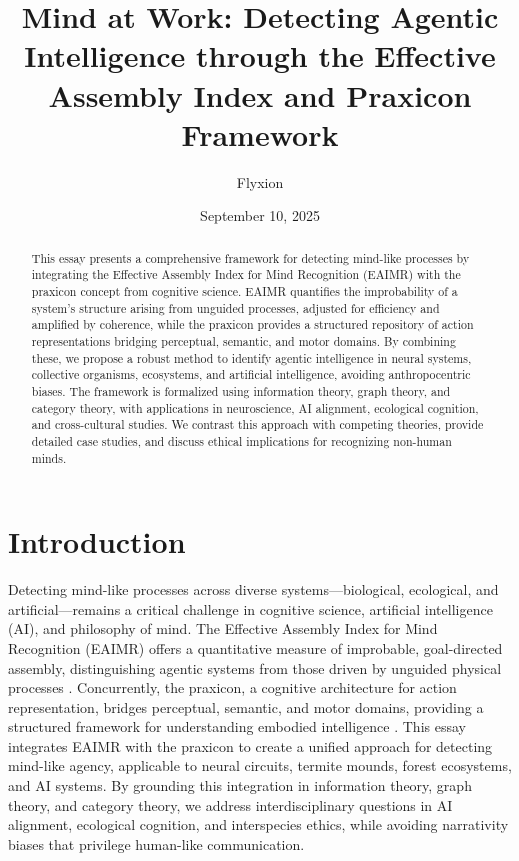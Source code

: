 \documentclass{article}
\title{Mind at Work: Detecting Agentic Intelligence through the Effective Assembly Index and Praxicon Framework}
\author{Flyxion}
\date{September 10, 2025}
\begin{document}
\maketitle

\begin{abstract}
This essay presents a comprehensive framework for detecting mind-like processes by integrating the Effective Assembly Index for Mind Recognition (EAIMR) with the praxicon concept from cognitive science. EAIMR quantifies the improbability of a system’s structure arising from unguided processes, adjusted for efficiency and amplified by coherence, while the praxicon provides a structured repository of action representations bridging perceptual, semantic, and motor domains. By combining these, we propose a robust method to identify agentic intelligence in neural systems, collective organisms, ecosystems, and artificial intelligence, avoiding anthropocentric biases. The framework is formalized using information theory, graph theory, and category theory, with applications in neuroscience, AI alignment, ecological cognition, and cross-cultural studies. We contrast this approach with competing theories, provide detailed case studies, and discuss ethical implications for recognizing non-human minds.
\end{abstract}

\section{Introduction}
\label{sec:introduction}

Detecting mind-like processes across diverse systems—biological, ecological, and artificial—remains a critical challenge in cognitive science, artificial intelligence (AI), and philosophy of mind. The Effective Assembly Index for Mind Recognition (EAIMR) offers a quantitative measure of improbable, goal-directed assembly, distinguishing agentic systems from those driven by unguided physical processes \citep{walker2013}. Concurrently, the praxicon, a cognitive architecture for action representation, bridges perceptual, semantic, and motor domains, providing a structured framework for understanding embodied intelligence \citep{pastra2011}. This essay integrates EAIMR with the praxicon to create a unified approach for detecting mind-like agency, applicable to neural circuits, termite mounds, forest ecosystems, and AI systems. By grounding this integration in information theory, graph theory, and category theory, we address interdisciplinary questions in AI alignment, ecological cognition, and interspecies ethics, while avoiding narrativity biases that privilege human-like communication.
\end{document}

